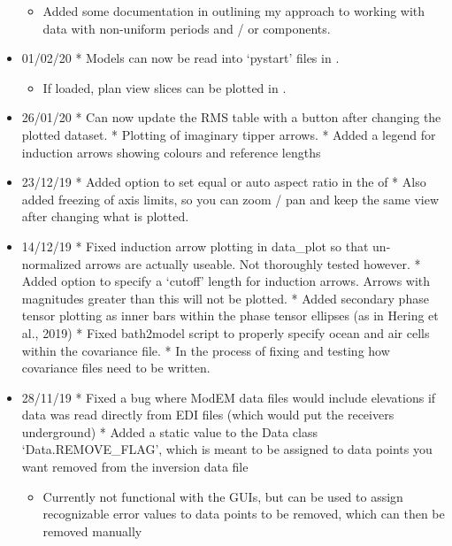 \documentclass[letterpaper,10pt,english]{sphinxmanual}
\begin{document}
\begin{itemize}
\begin{itemize}
\item {} 
Added some documentation in {\hyperref[\detokenize{content/examples/recipes:recipes}]{}} outlining my approach to working with data with non-uniform periods and / or components.

\end{itemize}

\item {} 
01/02/20
* Models can now be read into ‘pystart’ files in {\hyperref[\detokenize{content/data_plot/main_window:data-plot}]{}}.
\begin{itemize}
\item {} 
If loaded, plan view slices can be plotted in .

\end{itemize}

\item {} 
26/01/20
* Can now update the RMS table with a button after changing the plotted dataset.
* Plotting of imaginary tipper arrows.
* Added a legend for induction arrows showing colours and reference lengths

\item {} 
23/12/19
* Added option to set equal or auto aspect ratio in the {\hyperref[\detokenize{content/data_plot/map_viewer:map-window}]{}} of {\hyperref[\detokenize{content/data_plot/main_window:data-plot}]{}}
* Also added freezing of axis limits, so you can zoom / pan and keep the same view after changing what is plotted.

\item {} 
14/12/19
* Fixed induction arrow plotting in data\_plot so that un-normalized arrows are actually useable. Not thoroughly tested however.
* Added option to specify a ‘cutoff’ length for induction arrows. Arrows with magnitudes greater than this will not be plotted.
* Added secondary phase tensor plotting as inner bars within the phase tensor ellipses (as in Hering et al., 2019)
* Fixed bath2model script to properly specify ocean and air cells within the covariance file.
* In the process of fixing and testing how covariance files need to be written.

\item {} 
28/11/19
* Fixed a bug where ModEM data files would include elevations if data was read directly from EDI files (which would put the receivers underground)
* Added a static value to the Data class ‘Data.REMOVE\_FLAG’, which is meant to be assigned to data points you want removed from the inversion data file
\begin{itemize}
\item {} 
Currently not functional with the GUIs, but can be used to assign recognizable error values to data points to be removed, which can then be removed manually


\end{itemize}
\end{itemize}
\end{document}
